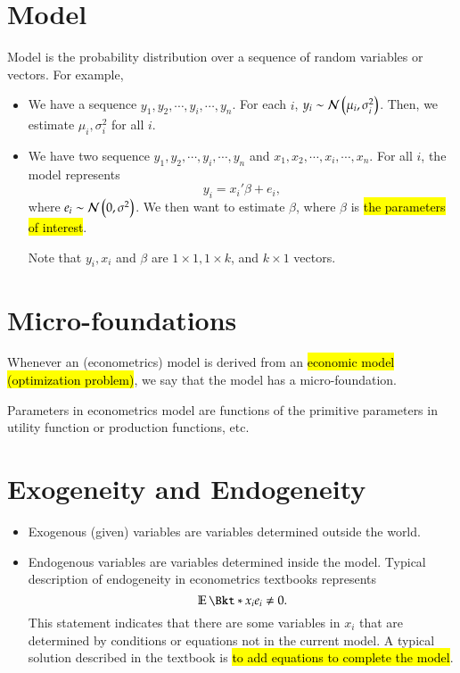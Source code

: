 \documentclass{Theme}
\begin{document}
\section{Model}
Model is the probability distribution over a sequence of
random variables or vectors. For example,
\begin{itemize}
    \item We have a sequence $y_1,y_2,\cdots,y_i,\cdots,y_n$.
    For each $i$, $y_i\sim \mathcal{N}\left(\mu_i,\sigma_i^2\right)$.
    Then, we estimate $\mu_i, \sigma_i^2$ for all $i$.
    \item We have two sequence
    $y_1,y_2,\cdots,y_i,\cdots,y_n$ and 
    $x_1,x_2,\cdots,x_i,\cdots,x_n$.
    For all $i$, the model represents
    \[
        y_i=x_i'\beta + e_i,
    \]
    where $e_i\sim \mathcal{N}\left(0,\sigma^2\right)$.
    We then want to estimate $\beta$, where $\beta$ is
    \hl{the parameters of interest}.
    
    Note that $y_i,x_i$ and $\beta$ are $1\times1, 1\times k$, and $k\times1$ vectors.
\end{itemize}

\section{Micro-foundations}
Whenever an (econometrics) model is derived from an 
\hl{economic model (optimization problem)},
we say that the model has a micro-foundation.

Parameters in econometrics model are functions of the 
primitive parameters in utility function or 
production functions, etc.

\section{Exogeneity and Endogeneity}
\begin{itemize}
    \item Exogenous (given) 
    variables are variables determined
    outside the world.
    \item Endogenous variables are variables determined
    inside the model.
    Typical description of endogeneity in econometrics
    textbooks represents
    \[
        \E{x_ie_i}\neq0.
    \]
    This statement indicates that there are some variables
    in $x_i$ that are determined by conditions
    or equations not in the current model. A typical solution
    described in the textbook is \hl{to add equations to
    complete the model}.
\end{itemize}
\end{document}
